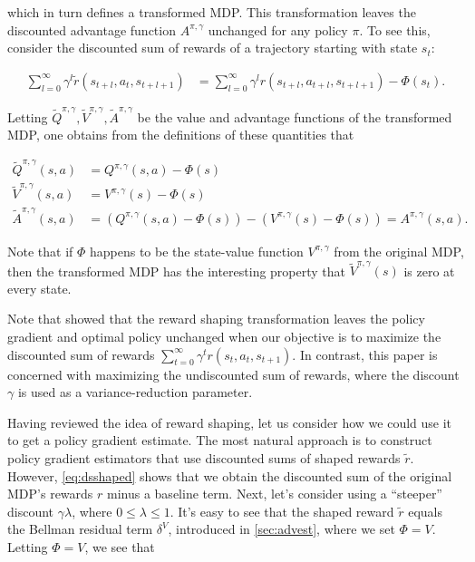 which in turn defines a transformed MDP. This transformation leaves the discounted advantage function $A^{\pi,\gamma}$ unchanged for any policy $\pi$.
To see this, consider the discounted sum of rewards of a trajectory starting with state $s_t$:

\begin{align}
\sum_{l=0}^{\infty} \gamma^{l}\tilde{r}(s_{t+l},a_t,s_{t+l+1}) &= \sum_{l=0}^{\infty} \gamma^{l}r(s_{t+l},a_{t+l},s_{t+l+1}) - \Phi(s_{t}).
\label{eq:dsshaped}
\end{align}

Letting $\tilde{Q}^{\pi,\gamma},\tilde{V}^{\pi,\gamma},\tilde{A}^{\pi,\gamma}$ be the value and advantage functions of the transformed MDP, one obtains from the definitions of these quantities that

\begin{align}
\tilde{Q}^{\pi,\gamma}(s, a) &= Q^{\pi,\gamma}(s,a) - \Phi(s)\\
\tilde{V}^{\pi,\gamma}(s, a) &= V^{\pi,\gamma}(s) - \Phi(s)\\
\tilde{A}^{\pi,\gamma}(s, a) &= (Q^{\pi,\gamma}(s,a) - \Phi(s)) - (V^{\pi,\gamma}(s) - \Phi(s)) = A^{\pi,\gamma}(s,a).
\end{align}

Note that if $\Phi$ happens to be the state-value function $V^{\pi,\gamma}$ from the original MDP, then the transformed MDP has the interesting property that $\tilde{V}^{\pi,\gamma}(s)$ is zero at every state.

Note that \citep{ng1999policy} showed that the reward shaping transformation leaves the policy gradient and optimal policy unchanged when our objective is to maximize the discounted sum of rewards $\sum_{t=0}^{\infty} \gamma^t r(s_t, a_t, s_{t+1})$. In contrast, this paper is concerned with maximizing the undiscounted sum of rewards, where the discount $\gamma$ is used as a variance-reduction parameter.

Having reviewed the idea of reward shaping, let us consider how we could use it to get a policy gradient estimate. The most natural approach is to construct policy gradient estimators that use discounted sums of shaped rewards $\tilde{r}$.
However, \ref{eq:dsshaped} shows that we obtain the discounted sum of the original MDP's rewards $r$ minus a baseline term. Next, let's consider using a ``steeper'' discount $\gamma \lambda$, where $0 \le \lambda \le 1$. It's easy to see that the shaped reward $\tilde{r}$ equals the Bellman residual term $\delta^V$, introduced in \ref{sec:advest}, where we set $\Phi=V$.
Letting $\Phi=V$, we see that

